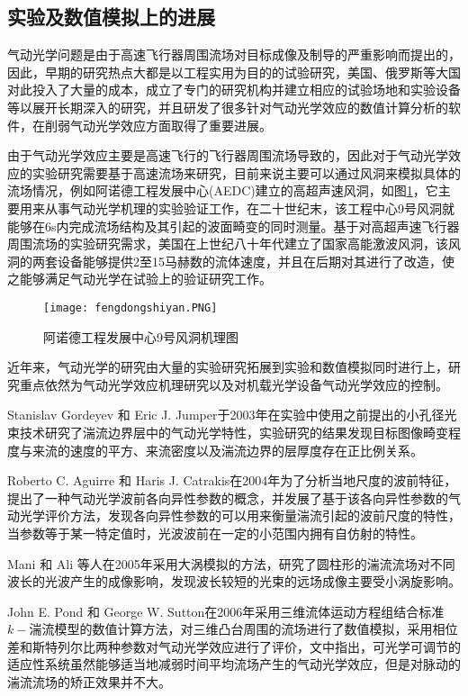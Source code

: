 \subsection{实验及数值模拟上的进展}
气动光学问题是由于高速飞行器周围流场对目标成像及制导的严重影响而提出的，因此，早期的研究热点大都是以工程实用为目的的试验研究，美国、俄罗斯等大国对此投入了大量的成本，成立了专门的研究机构并建立相应的试验场地和实验设备等以展开长期深入的研究，并且研发了很多针对气动光学效应的数值计算分析的软件，在削弱气动光学效应方面取得了重要进展。

由于气动光学效应主要是高速飞行的飞行器周围流场导致的，因此对于气动光学效应的实验研究需要基于高速流场来研究，目前来说主要可以通过风洞来模拟具体的流场情况，例如阿诺德工程发展中心(AEDC)建立的高超声速风洞，如图\ref{fig:fengdong}，它主要用来从事气动光学机理的实验验证工作\cite{havener1992}，在二十世纪末，该工程中心9号风洞就能够在6s内完成流场结构及其引起的波面畸变的同时测量。基于对高超声速飞行器周围流场的实验研究需求，美国在上世纪八十年代建立了国家高能激波风洞，该风洞的两套设备能够提供2至15马赫数的流体速度，并且在后期对其进行了改造，使之能够满足气动光学在试验上的验证研究工作\cite{claspan1990}。
\begin{figure}[bhtp]
\centering
\texttt{[image: fengdongshiyan.PNG]}
\caption{阿诺德工程发展中心9号风洞机理图}
\label{fig:fengdong}
\end{figure}

近年来，气动光学的研究由大量的实验研究拓展到实验和数值模拟同时进行上，研究重点依然为气动光学效应机理研究以及对机载光学设备气动光学效应的控制。

Stanislav Gordeyev 和 Eric J. Jumper于2003年在实验中使用之前提出的小孔径光束技术研究了湍流边界层中的气动光学特性，实验研究的结果发现目标图像畸变程度与来流的速度的平方、来流密度以及湍流边界的层厚度存在正比例关系\cite{stanislav2003}。

Roberto C. Aguirre 和 Haris J. Catrakis在2004年为了分析当地尺度的波前特征，提出了一种气动光学波前各向异性参数的概念，并发展了基于该各向异性参数的气动光学评价方法\cite{aguirre2004}，发现各向异性参数的可以用来衡量湍流引起的波前尺度的特性，当参数等于某一特定值时，光波波前在一定的小范围内拥有自仿射的特性。

Mani 和 Ali 等人在2005年采用大涡模拟的方法，研究了圆柱形的湍流流场对不同波长的光波产生的成像影响\cite{mani2005}，发现波长较短的光束的远场成像主要受小涡旋影响。

John E. Pond 和 George W. Sutton在2006年采用三维流体运动方程组结合标准$k - $\textepsilon 湍流模型的数值计算方法，对三维凸台周围的流场进行了数值模拟，采用相位差和斯特列尔比两种参数对气动光学效应进行了评价，文中指出，可光学可调节的适应性系统虽然能够适当地减弱时间平均流场产生的气动光学效应，但是对脉动的湍流流场的矫正效果并不大\cite{john2006}。

